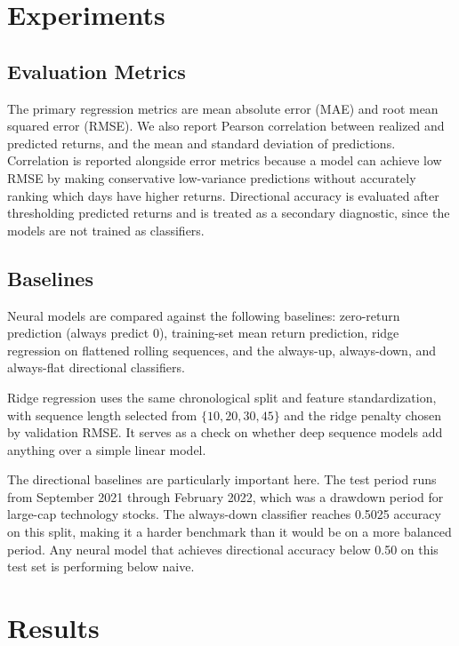 \documentclass[10pt,twocolumn]{article}
\begin{document}
\section{Experiments}

\subsection{Evaluation Metrics}

The primary regression metrics are mean absolute error (MAE) and root mean squared error (RMSE). We also report Pearson correlation between realized and predicted returns, and the mean and standard deviation of predictions. Correlation is reported alongside error metrics because a model can achieve low RMSE by making conservative low-variance predictions without accurately ranking which days have higher returns. Directional accuracy is evaluated after thresholding predicted returns and is treated as a secondary diagnostic, since the models are not trained as classifiers.

\subsection{Baselines}

Neural models are compared against the following baselines: zero-return prediction (always predict 0), training-set mean return prediction, ridge regression on flattened rolling sequences, and the always-up, always-down, and always-flat directional classifiers.

Ridge regression uses the same chronological split and feature standardization, with sequence length selected from $\{10,20,30,45\}$ and the ridge penalty chosen by validation RMSE. It serves as a check on whether deep sequence models add anything over a simple linear model.

The directional baselines are particularly important here. The test period runs from September 2021 through February 2022, which was a drawdown period for large-cap technology stocks. The always-down classifier reaches 0.5025 accuracy on this split, making it a harder benchmark than it would be on a more balanced period. Any neural model that achieves directional accuracy below 0.50 on this test set is performing below naive.

\section{Results}
\end{document}
